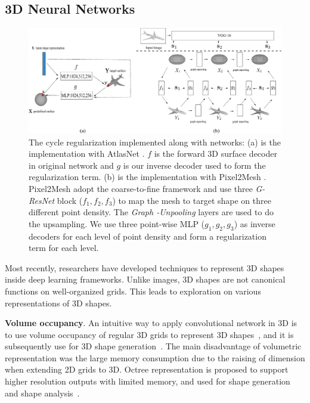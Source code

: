 \subsection{3D Neural Networks}
\begin{figure}[htbp]
	\centering
	\includegraphics[width=\linewidth]{img/net/net}
	\caption{The cycle regularization implemented along with networks: (a) is the implementation with AtlasNet \cite{atlasnet}. $f$ is the forward 3D surface decoder in original network and $g$ is our inverse decoder used to form the regularization term. (b) is the implementation with Pixel2Mesh \cite{pixel2mesh}.  Pixel2Mesh \cite{pixel2mesh} adopt the coarse-to-fine framework and use three \emph{G-ResNet} block ($f_1,f_2,f_3$) to map the mesh to target shape on three different point density. The \emph{Graph -Unpooling} layers are used to do the upsampling. We use three point-wise MLP ($g_1,g_2,g_3$) as inverse decoders for each level of point density and form a regularization term for each level.}
	\label{fig:net}
\end{figure}
Most recently, researchers have developed techniques to represent 3D shapes inside deep learning frameworks. Unlike images, 3D shapes are not canonical functions on well-organized grids.
This leads to exploration on various representations of 3D shapes.

\noindent\textbf{Volume occupancy}. 
An intuitive way to apply convolutional network in 3D is to use volume occupancy of regular 3D grids to represent 3D shapes~\cite{3dshapenet}, and it is subsequently use for 3D shape generation~\cite{3DR2N2,learnobj}.
%
The main disadvantage of volumetric representation was the large memory consumption due to the raising of dimension when extending 2D grids to 3D. 
Octree representation is proposed to support higher resolution outputs with limited memory, and used for shape generation~\cite{octreegen} and shape analysis~\cite{ocnn}.

